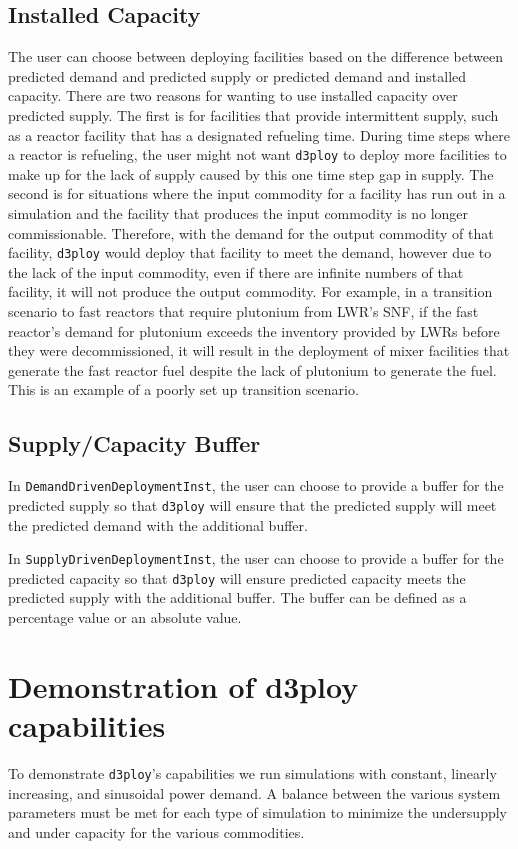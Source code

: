 \documentclass[11pt,letterpaper]{article}
\newcommand{\deploy}{\texttt{d3ploy}\xspace}%
\begin{document}
\subsection{\textbf{Installed Capacity}}
The user can choose between deploying facilities based on the difference 
between predicted demand and predicted supply or predicted demand and 
installed capacity. 
There are two reasons for wanting to use installed capacity over predicted 
supply. 
The first is for facilities that provide intermittent supply, such as a 
reactor facility that has a designated refueling time. 
During time steps where a reactor is refueling, the user might not 
want \deploy to deploy more facilities to make up for the lack of supply
caused by this one time step gap in supply. 
The second is for situations where the input commodity for a facility has
run out in a simulation and the facility that produces the input commodity 
is no longer commissionable. 
Therefore, with the demand for the output commodity of that facility, \deploy
would deploy that facility to meet the demand, however due to the lack of 
the input commodity, even if there are infinite numbers of that facility, 
it will not produce the output commodity. 
For example, in a transition scenario to fast reactors that require plutonium 
from \gls{LWR}'s \gls{SNF}, if the fast reactor's demand for plutonium exceeds
the inventory provided by \gls{LWR}s before they were decommissioned, it will 
result in the deployment of mixer facilities that generate the fast reactor 
fuel despite the lack of plutonium to generate the fuel. 
This is an example of a poorly set up transition scenario. 

\subsection{\textbf{Supply/Capacity Buffer}}
In \texttt{DemandDrivenDeploymentInst}, the user can choose to provide a
buffer for the predicted supply so that \deploy will ensure that 
the predicted supply will meet the predicted demand with the 
additional buffer. 

In \texttt{SupplyDrivenDeploymentInst}, the user can choose to 
provide a buffer for the predicted capacity so that \deploy will 
ensure predicted capacity meets the predicted supply with the 
additional buffer. 
The buffer can be defined as a percentage value or an absolute value.  

\section{Demonstration of d3ploy capabilities}
To demonstrate \deploy's capabilities we run simulations with
constant, linearly increasing, and sinusoidal power demand.
A balance between the various system parameters must be 
met for each type of simulation to minimize the undersupply
and under capacity for the various commodities. 
\end{document}
